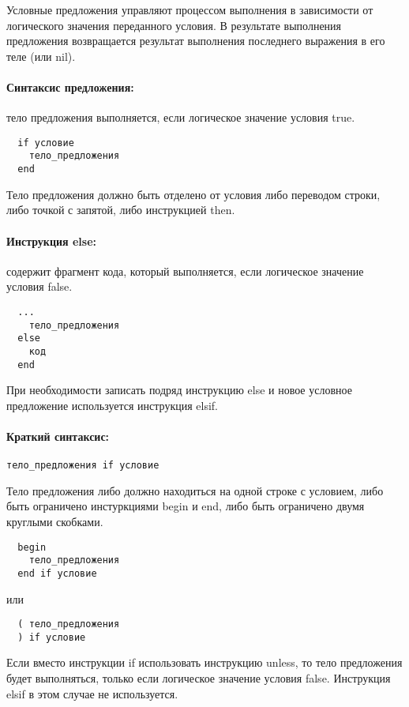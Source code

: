 Условные предложения управляют процессом выполнения в зависимости от логического значения переданного условия. В результате выполнения предложения возвращается результат выполнения последнего выражения в его теле (или nil).

\paragraph*{Синтаксис предложения:} тело предложения выполняется, если логическое значение условия true.

\begin{verbatim}
  if условие
    тело_предложения
  end
\end{verbatim}

Тело предложения должно быть отделено от условия либо переводом строки, либо точкой с запятой, либо инструкцией then.

\paragraph*{Инструкция else:} содержит фрагмент кода, который выполняется, если логическое значение условия false.

\begin{verbatim}
  ...
    тело_предложения
  else
    код
  end
\end{verbatim}

При необходимости записать подряд инструкцию else и новое условное предложение используется инструкция elsif.

\paragraph*{Краткий синтаксис:} \verb!тело_предложения if условие!

Тело предложения либо должно находиться на одной строке с условием, либо быть ограничено инстуркциями begin и end, либо быть ограничено двумя круглыми скобками.
\begin{verbatim}
  begin
    тело_предложения
  end if условие
\end{verbatim}
или
\begin{verbatim}
  ( тело_предложения
  ) if условие
\end{verbatim}

Если вместо инструкции if использовать инструкцию unless, то тело предложения будет выполняться, только если логическое значение условия false. Инструкция elsif в этом случае не используется.

